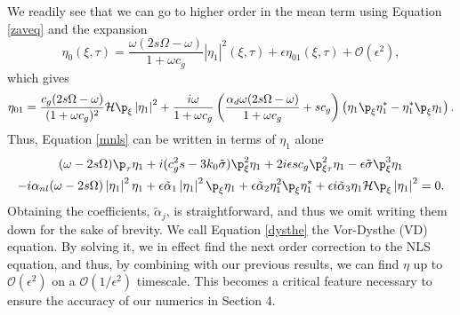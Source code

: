 \documentclass{JFM_Style/jfm}
\begin{document}
We readily see that we can go to higher order in the mean term using Equation \eqref{zaveq} and the expansion
\[
\eta_{0}(\xi,\tau) = \frac{\omega(2s\Omega-\omega)}{1+\omega c_{g}}\left|\eta_{1}\right|^{2}(\xi,\tau) + \epsilon \eta_{01}(\xi,\tau) + \mathcal{O}(\epsilon^{2}),
\]
which gives
\[
\eta_{01}= \frac{c_{g}(2s\Omega-\omega)}{(1+\omega c_{g})^{2}}\mathcal{H}\p_{\xi}\left|\eta_{1}\right|^{2} + \frac{i\omega}{1+\omega c_{g}}\left(\frac{\alpha_{d}\omega(2s\Omega-\omega)}{1+\omega c_{g}} + s c_{g} \right) \left(\eta_{1}\p_{\xi}\eta_{1}^{\ast} - \eta_{1}^{\ast}\p_{\xi}\eta_{1} \right).
\]
Thus, Equation \eqref{mnls} can be written in terms of $\eta_{1}$ alone
\begin{multline}
(\omega-2s\Omega)\p_{\tau}\eta_{1} + i(c_{g}^{2}s-3k_{0}\tilde{\sigma})\p_{\xi}^{2}\eta_{1} + 2i\epsilon s c_{g}\p^{2}_{\xi\tau}\eta_{1} - \epsilon\tilde{\sigma} \p^{3}_{\xi}\eta_{1} \\
- i \alpha_{nl}(\omega-2s\Omega)\left|\eta_{1}\right|^{2}\eta_{1}
+ \epsilon \tilde{\alpha}_{1}\left|\eta_{1}\right|^{2}\p_{\xi}\eta_{1}
+ \epsilon\tilde{\alpha}_{2}\eta_{1}^{2}\p_{\xi}\eta^{\ast}_{1} +
\epsilon i\tilde{\alpha}_{3}\eta_{1}\mathcal{H}\p_{\xi}\left|\eta_{1}\right|^{2}= 0.
\label{dysthe}
\end{multline}
Obtaining the coefficients, $\tilde{\alpha}_{j}$, is straightforward, and thus we omit writing them down for the sake of brevity.  We call Equation \eqref{dysthe} the Vor-Dysthe (VD) equation.  By solving it, we in effect find the next order correction to the NLS equation, and thus, by combining with our previous results, we can find $\eta$ up to $\mathcal{O}(\epsilon^{2})$ on a $\mathcal{O}(1/\epsilon^{2})$ timescale.  This becomes a critical feature necessary to ensure the accuracy of our numerics in Section 4.
\end{document}
